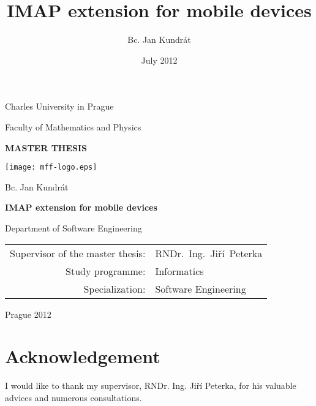 \documentclass[11pt,a4paper]{report}
\begin{document}

\title{IMAP extension for mobile devices}

\author{Bc. Jan Kundrát}

\date{July 2012}

\begin{titlepage}
\begin{center}
\large

Charles University in Prague

\medskip

Faculty of Mathematics and Physics

\vfill

{\bf\Large MASTER THESIS}

\vfill

\centerline{\mbox{\texttt{[image: mff-logo.eps]}}}

\vfill
\vspace{5mm}

{\LARGE Bc. Jan Kundrát}

\vspace{15mm}

{\LARGE\bfseries IMAP extension for mobile devices}

\vfill

Department of Software Engineering

\vfill

\begin{tabular}{rl}

Supervisor of the master thesis: & RNDr.~Ing.~Jiří~Peterka \\
\noalign{\vspace{2mm}}
Study programme: & Informatics \\
\noalign{\vspace{2mm}}
Specialization: & Software Engineering \\
\end{tabular}

\vfill

Prague 2012

\end{center}
\end{titlepage}

\section*{Acknowledgement}
I would like to thank my supervisor, RNDr. Ing. Jiří Peterka, for his valuable advices and numerous consultations.
\end{document}
